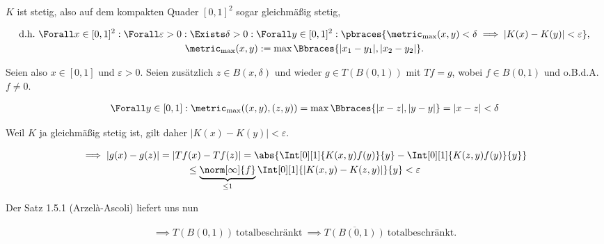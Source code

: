 \begin{solution}
\begin{enumerate}
\begin{enumerate}
\begin{enumerate}[label = \arabic*.]
            $K$ ist stetig, also auf dem kompakten Quader $[0, 1]^2$ sogar gleichmäßig stetig,
            
            \begin{gather*}
                \text{d.h.}~
                \Forall x \in [0, 1]^2:
                \Forall \varepsilon > 0:
                \Exists \delta > 0:
                \Forall y \in [0, 1]^2:
                \pbraces
                {
                    \metric_{\max}(x, y) < \delta
                    \implies
                    |K(x) - K(y)| < \varepsilon   
                }, \\
                \metric_{\max}(x, y)
                :=
                \max \Bbraces{|x_1 - y_1|, |x_2 - y_2|}.
            \end{gather*}

            Seien also $x \in [0, 1]$ und $\varepsilon > 0$.
            Seien zusätzlich $z \in B(x, \delta)$ und wieder $g \in T(B(0, 1))$ mit $Tf = g$, wobei $f \in B(0, 1)$ und o.B.d.A. $f \neq 0$.

            \begin{align*}
                \Forall y \in [0, 1]:
                \metric_{\max}((x, y), (z, y))
                =
                \max \Bbraces{|x - z|, |y - y|}
                =
                |x - z|
                <
                \delta
            \end{align*}

            Weil $K$ ja gleichmäßig stetig ist, gilt daher $|K(x) - K(y)| < \varepsilon$.

            \begin{multline*}
                \implies
                |g(x) - g(z)|
                =
                |Tf(x) - Tf(z)|
                =
                \abs
                {
                    \Int[0][1]{K(x, y) f(y)}{y}
                    -
                    \Int[0][1]{K(z, y) f(y)}{y}
                } \\
                \leq
                \underbrace
                {
                    \norm[\infty]{f}
                }_{
                    \leq 1
                }
                \Int[0][1]{|K(x, y) - K(z, y)|}{y}
                <
                \varepsilon
            \end{multline*}

        \end{enumerate}

        Der Satz 1.5.1 (Arzelà-Ascoli) liefert uns nun

        \begin{align*}
            \implies
            T(B(0, 1))
            ~\text{totalbeschränkt}~
            \implies
            \overline{T(B(0, 1))}
            ~\text{totalbeschränkt}.
        \end{align*}

    \end{enumerate}

\end{enumerate}

\end{solution}

